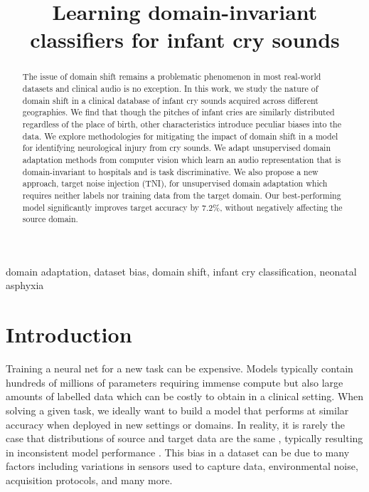\documentclass{article}
\title{Learning domain-invariant classifiers for infant cry sounds}
\begin{document}
%
\maketitle
%
\begin{abstract}

The issue of domain shift remains a problematic phenomenon in most real-world datasets and clinical audio is no exception. In this work, we study the nature of domain shift in a clinical database of infant cry sounds acquired across different geographies. We find that though the pitches of infant cries are similarly distributed regardless of the place of birth, other characteristics introduce peculiar biases into the data. We explore methodologies for mitigating the impact of domain shift in a model for identifying neurological injury from cry sounds. We adapt unsupervised domain adaptation methods from computer vision which learn an audio representation that is domain-invariant to hospitals and is task discriminative. We also propose a new approach, target noise injection (TNI), for unsupervised domain adaptation which requires neither labels nor training data from the target domain. Our best-performing model significantly improves target accuracy by 7.2\%, without negatively affecting the source domain.
\end{abstract}
%
\begin{keywords}
domain adaptation, dataset bias, domain shift, infant cry classification, neonatal asphyxia
\end{keywords}
%
\section{Introduction}
\label{sec:intro} 
\def\thefootnote{*}

Training a neural net for a new task can be expensive. Models typically contain hundreds of millions of parameters requiring immense compute but also large amounts of labelled data which can be costly to obtain in a clinical setting. When solving a given task, we ideally want to build a model that performs at similar accuracy when deployed in new settings or domains. In reality, it is rarely the case that distributions of source and target data are the same \cite{candela2009dataset}, typically resulting in inconsistent model performance \cite{torralba2011unbiased, yosinski2014transferable}. This bias in a dataset can be due to many factors including variations in sensors used to capture data, environmental noise, acquisition protocols, and many more. 
\end{document}
